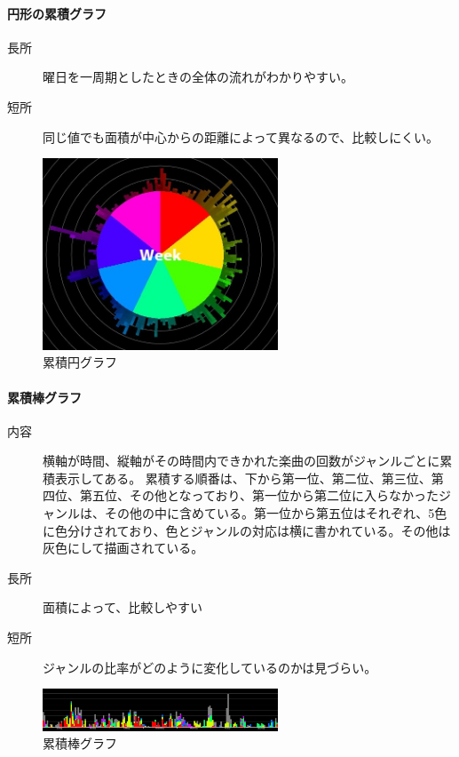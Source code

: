 \documentclass{jsarticle}
\begin{document}
\paragraph{円形の累積グラフ}

\begin{description}
\item[長所]
曜日を一周期としたときの全体の流れがわかりやすい。
\item[短所]
同じ値でも面積が中心からの距離によって異なるので、比較しにくい。
\end{description}

\begin{figure}[htbp]
\begin{center}
\includegraphics[width=7cm]{circleGraph.jpg}
\caption{累積円グラフ}
\end{center}
\end{figure}

\paragraph{累積棒グラフ}

\begin{description}
\item[内容]
横軸が時間、縦軸がその時間内できかれた楽曲の回数がジャンルごとに累積表示してある。
累積する順番は、下から第一位、第二位、第三位、第四位、第五位、その他となっており、第一位から第二位に入らなかったジャンルは、その他の中に含めている。第一位から第五位はそれぞれ、5色に色分けされており、色とジャンルの対応は横に書かれている。その他は灰色にして描画されている。
\item[長所]
面積によって、比較しやすい
\item[短所]
ジャンルの比率がどのように変化しているのかは見づらい。
\end{description}



\begin{figure}[htbp]
\begin{center}
\includegraphics[width=7cm]{barGraph.jpg}
\caption{累積棒グラフ}
\end{center}
\end{figure}
\end{document}
